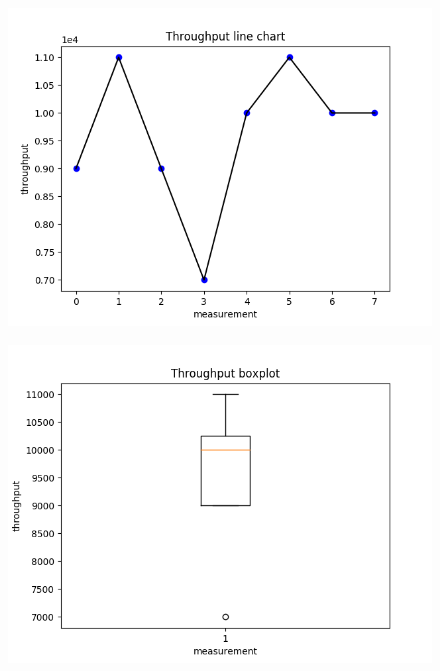 \documentclass{article}
\begin{document}
\begin{figure}[ht] \label{usrp-success-2}
	\includegraphics[width=\textwidth]{usrp_success_tp_line}	
\end{figure}

\begin{figure}[h] \label{usrp-success-3}
	\includegraphics[width=\textwidth]{usrp_success_tp_boxplot}	
\end{figure}
\end{document}
